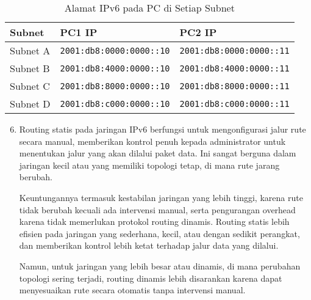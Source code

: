 \begin{table}[h]
    \centering
    \caption{Alamat IPv6 pada PC di Setiap Subnet}
    \begin{tabular}{|p{2cm}|p{5cm}|p{5cm}|}
        \hline
        \textbf{Subnet} & \textbf{PC1 IP} & \textbf{PC2 IP} \\
        \hline
        Subnet A & \texttt{2001:db8:0000:0000::10} & \texttt{2001:db8:0000:0000::11} \\
        \hline
        Subnet B & \texttt{2001:db8:4000:0000::10} & \texttt{2001:db8:4000:0000::11} \\
        \hline
        Subnet C & \texttt{2001:db8:8000:0000::10} & \texttt{2001:db8:8000:0000::11} \\
        \hline
        Subnet D & \texttt{2001:db8:c000:0000::10} & \texttt{2001:db8:c000:0000::11} \\
        \hline
    \end{tabular}
\end{table}

\begin{enumerate}
    \setcounter{enumi}{5} %

    \item Routing statis pada jaringan IPv6 berfungsi untuk mengonfigurasi jalur rute secara manual, memberikan kontrol penuh kepada administrator untuk menentukan jalur yang akan dilalui paket data. Ini sangat berguna dalam jaringan kecil atau yang memiliki topologi tetap, di mana rute jarang berubah. 
    
    Keuntungannya termasuk kestabilan jaringan yang lebih tinggi, karena rute tidak berubah kecuali ada intervensi manual, serta pengurangan overhead karena tidak memerlukan protokol routing dinamis. Routing statis lebih efisien pada jaringan yang sederhana, kecil, atau dengan sedikit perangkat, dan memberikan kontrol lebih ketat terhadap jalur data yang dilalui.
    
    Namun, untuk jaringan yang lebih besar atau dinamis, di mana perubahan topologi sering terjadi, routing dinamis lebih disarankan karena dapat menyesuaikan rute secara otomatis tanpa intervensi manual.
\end{enumerate}

